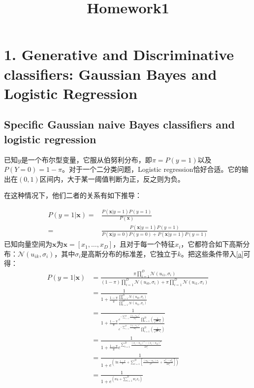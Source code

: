 \documentclass[12pt, letterpaper]{article}
\title{Homework1}
\begin{document}
\maketitle
\section{1. Generative and Discriminative classifiers: Gaussian Bayes and Logistic
Regression}

\subsection{ Specific Gaussian naive Bayes classifiers and logistic regression}
已知$y$是一个布尔型变量，它服从伯努利分布，即$\pi=P(y=1)$以及$P(Y=0)=1-\pi$。对于一个二分类问题，Logistic regression恰好合适。它的输出在$(0,1)$区间内，大于某一阈值判断为正，反之则为负。

在这种情况下，他们二者的关系有如下推导：

\begin{equation}
\begin{aligned}
P(y=1|\mathbf{x})=&\frac{P(\mathbf{x}|y=1)P(y=1)}{P(\mathbf{x})}\\
=&\frac{P(\mathbf{x}|y=1)P(y=1)}{P(\mathbf{x}|y=0)P(y=0)+P(\mathbf{x}|y=1)P(y=1)}
\label{a}
\end{aligned}
\end{equation}
已知向量空间为$\mathbf{x}$为$\mathbf{x}=[x_1,\ldots,x_D]$，且对于每一个特征$x_i$，它都符合如下高斯分布：$\mathcal{N}(u_{ik},\sigma_i)$，其中$\sigma_i$是高斯分布的标准差，它独立于$k$。把这些条件带入\ref{a}可得：
\begin{equation}
\begin{aligned}
P(y=1|\mathbf{x})&=\frac{\pi\prod_{i=1}^D\mathcal{N}(u_{i1},\sigma_i)}{(1-\pi)\prod_{i=1}^D\mathcal{N}(u_{i0},\sigma_i)+\pi\prod_{i=1}^D\mathcal{N}(u_{i1},\sigma_i)}\\
&=\frac{1}{1+\frac{1-\pi}{\pi}\frac{\prod_{i=1}^D\mathcal{N}(u_{i0},\sigma_i)}{\prod_{i=1}^D\mathcal{N}(u_{i1},\sigma_i)}}\\
&=\frac{1}{1+\frac{1-\pi}{\pi}\frac{e^{-\sum_{i=1}^D\frac{(x_i-u_{i0})^2}{2\sigma_i^2}}\prod_{i=1}^D(\frac{1}{\sqrt{2\pi}\sigma_i})}{e^{-\sum_{i=1}^D\frac{(x_i-u_{i1})^2}{2\sigma_i^2}}\prod_{i=1}^D(\frac{1}{\sqrt{2\pi}\sigma_i})}}\\
&=\frac{1}{1+\frac{1-\pi}{\pi}e^{\sum_{i=1}^D\frac{(x_i-u_{i1})^2-(x_i-u_{i0})^2}{2\sigma_i^2}}}\\
&=\frac{1}{1+e^{(\ln\frac{1-\pi}{\pi}+\sum_{i=1}^D[\frac{(u_{i0}-u_{i1})x_i}{\sigma^2}+\frac{u_{i1}^2-u_{i0}^2}{2\sigma_i^2}])}}\\
&=\frac{1}{1+e^{(w_0+\sum_{i=1}^Dw_ix_i)}}
\label{b}
\end{aligned}
\end{equation}
\end{document}
